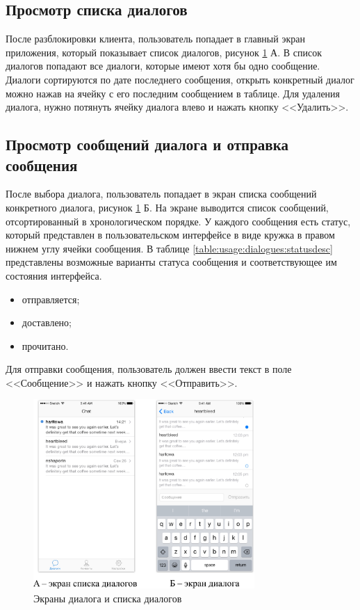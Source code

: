 \subsection{Просмотр списка диалогов}
\label{sec:usage:dialogues}

После разблокировки клиента, пользователь попадает в главный экран приложения, который показывает список диалогов, рисунок \ref{sec:usage:dialogues:ui} А. В список диалогов попадают все диалоги, которые имеют хотя бы одно сообщение. Диалоги сортируются по дате последнего сообщения, открыть конкретный диалог можно нажав на ячейку с его последним сообщением в таблице. Для удаления диалога, нужно потянуть ячейку диалога влево и нажать кнопку <<Удалить>>.

\subsection{Просмотр сообщений диалога и отправка сообщения}
\label{sec:usage:dialogue}

После выбора диалога, пользователь попадает в экран списка сообщений конкретного диалога, рисунок \ref{sec:usage:dialogues:ui} Б. На экране выводится список сообщений, отсортированный в хронологическом порядке. У каждого сообщения есть статус, который представлен в пользовательском интерфейсе в виде кружка в правом нижнем углу ячейки сообщения. В таблице \ref{table:usage:dialogues:statusdesc} представлены возможные варианты статуса сообщения и соответствующее им состояния интерфейса.

\begin{itemize}
	\item отправляется;
	\item доставлено;
	\item прочитано.
\end{itemize}

Для отправки сообщения, пользователь должен ввести текст в поле <<Сообщение>> и нажать кнопку <<Отправить>>.

\begin{figure}[h]
  \centering
    \includegraphics[width=0.75\textwidth]{inc/img/ui/dialogue.jpg}
  \caption{Экраны диалога и списка диалогов}
  \label{sec:usage:dialogues:ui}
\end{figure}

